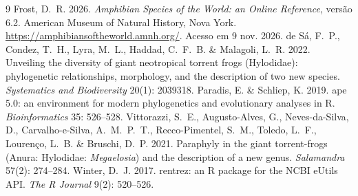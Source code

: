 \documentclass[11pt,a4paper]{article}
\begin{document}
\begin{thebibliography}{9}
 Frost, D.~R. 2026. \emph{Amphibian Species of the World: an Online Reference},
versão 6.2. American Museum of Natural History, Nova York.
\url{https://amphibiansoftheworld.amnh.org/}. Acesso em 9 nov. 2026.
 de Sá, F.~P., Condez, T.~H., Lyra, M.~L., Haddad, C.~F.~B. \& Malagoli, L.~R.
2022. Unveiling the diversity of giant neotropical torrent frogs (Hylodidae): phylogenetic
relationships, morphology, and the description of two new species. \emph{Systematics and
Biodiversity} 20(1): 2039318.
 Paradis, E. \& Schliep, K. 2019. ape 5.0: an environment for modern
phylogenetics and evolutionary analyses in R. \emph{Bioinformatics} 35: 526--528.
 Vittorazzi, S.~E., Augusto-Alves, G., Neves-da-Silva, D.,
Carvalho-e-Silva, A.~M.~P.~T., Recco-Pimentel, S.~M., Toledo, L.~F., Lourenço, L.~B. \&
Bruschi, D.~P. 2021. Paraphyly in the giant torrent-frogs (Anura: Hylodidae:
\emph{Megaelosia}) and the description of a new genus. \emph{Salamandra} 57(2): 274--284.
 Winter, D.~J. 2017. rentrez: an R package for the NCBI eUtils API.
\emph{The R Journal} 9(2): 520--526.
\end{thebibliography}
\end{document}
